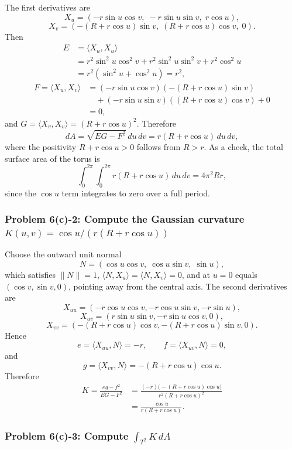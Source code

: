 \documentclass[11pt]{article}
\begin{document}
The first derivatives are
\[
 X_u=(-r\sin u\cos v,\;-r\sin u\sin v,\;r\cos u),
\]
\[
 X_v=(-(R+r\cos u)\sin v,\;(R+r\cos u)\cos v,\;0).
\]
Then
\[
\begin{aligned}
 E&=\langle X_u,X_u\rangle\\
 &=r^2\sin^2u\cos^2v+r^2\sin^2u\sin^2v+r^2\cos^2u\\
 &=r^2(\sin^2u+\cos^2u)=r^2,
\end{aligned}
\]
\[
\begin{aligned}
 F=\langle X_u,X_v\rangle
 &=(-r\sin u\cos v)(-(R+r\cos u)\sin v)\\
 &\quad+(-r\sin u\sin v)((R+r\cos u)\cos v)+0\\
 &=0,
\end{aligned}
\]
and $G=\langle X_v,X_v\rangle=(R+r\cos u)^2$. Therefore
\[
 dA=\sqrt{EG-F^2}\,du\,dv
 =
 r(R+r\cos u)\,du\,dv,
\]
where the positivity $R+r\cos u>0$ follows from $R>r$. As a check, the total surface area of the torus is
\[
 \int_0^{2\pi}\int_0^{2\pi}
 r(R+r\cos u)\,du\,dv
 =
 4\pi^2Rr,
\]
since the $\cos u$ term integrates to zero over a full period.

\subsubsection*{Problem 6(c)-2: Compute the Gaussian curvature $K(u,v)=\cos u/(r(R+r\cos u))$}

Choose the outward unit normal
\[
 N=(\cos u\cos v,\;\cos u\sin v,\;\sin u),
\]
which satisfies $\|N\|=1$, $\langle N,X_u\rangle=\langle N,X_v\rangle=0$, and at $u=0$ equals $(\cos v,\sin v,0)$, pointing away from the central axis. The second derivatives are
\[
 X_{uu}=(-r\cos u\cos v,-r\cos u\sin v,-r\sin u),
\]
\[
 X_{uv}=(r\sin u\sin v,-r\sin u\cos v,0),
\]
\[
 X_{vv}=(-(R+r\cos u)\cos v,-(R+r\cos u)\sin v,0).
\]
Hence
\[
 e=\langle X_{uu},N\rangle=-r,
 \qquad
 f=\langle X_{uv},N\rangle=0,
\]
and
\[
 g=\langle X_{vv},N\rangle=-(R+r\cos u)\cos u.
\]
Therefore
\[
\begin{aligned}
 K
 =
 \frac{eg-f^2}{EG-F^2}
 &=
 \frac{(-r)\bigl(-(R+r\cos u)\cos u\bigr)}
 {r^2(R+r\cos u)^2}\\
 &=
 \frac{\cos u}{r(R+r\cos u)}.
\end{aligned}
\]

\subsubsection*{Problem 6(c)-3: Compute $\int_{T^2}K\,dA$}
\end{document}
